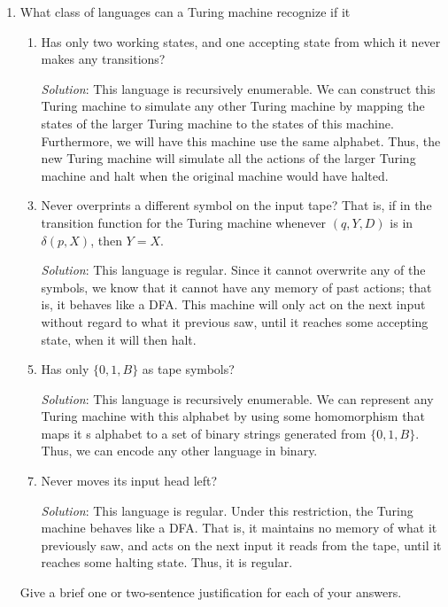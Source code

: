\documentclass[]{article}
\begin{document}
\begin{enumerate}
\item What class of languages can a Turing machine recognize if it
\begin{enumerate}
\item Has only two working states, and one accepting state from which it never
makes any transitions?
\item[\emph{Solution}:] This language is recursively enumerable. We can
construct this Turing machine to simulate any other Turing machine by mapping
the states of the larger Turing machine to the states of this machine.
Furthermore, we will have this machine use the same alphabet. Thus, the new
Turing machine will simulate all the actions of the larger Turing machine and
halt when the original machine would have halted.

\item Never overprints a different symbol on the input tape? That is, if in the
transition function for the Turing machine whenever $(q, Y, D)$ is in
$\delta(p,X)$, then $Y = X$.
\item[\emph{Solution}:] This language is regular. Since it cannot overwrite any
of the symbols, we know that it cannot have any memory of past actions; that is,
it behaves like a DFA. This machine will only act on the next input without
regard to what it previous saw, until it reaches some accepting state, when it
will then halt.

\item Has only $\{0, 1, B\}$ as tape symbols?
\item[\emph{Solution}:] This language is recursively enumerable. We can
represent any Turing machine with this alphabet by using some homomorphism that
maps it  s alphabet to a set of binary strings generated from $\{0, 1, B\}$.
Thus, we can encode any other language in binary.

\item Never moves its input head left?
\item[\emph{Solution}:] This language is regular. Under this restriction, the
Turing machine behaves like a DFA. That is, it maintains no memory of what it
previously saw, and acts on the next input it reads from the tape, until it
reaches some halting state. Thus, it is regular.
\end{enumerate}

Give a brief one or two-sentence justification for each of your answers.
\end{enumerate}
\end{document}
